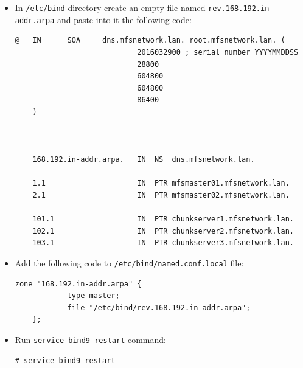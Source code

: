 \documentclass[a4paper,11pt,english]{report}
\def\code#1{\texttt{#1}}
\begin{document}
			\begin{itemize}
				\item In \code{/etc/bind} directory create an empty file named \code{rev.168.192.in-addr.arpa} and paste into it the following code:
					
					\begin{lstlisting}[caption={Content of \code{rev.168.192.in-addr.arpa} file}]
	@	IN      SOA     dns.mfsnetwork.lan. root.mfsnetwork.lan. (
							2016032900 ; serial number YYYYMMDDSS
							28800
							604800
							604800
							86400
	)
	
	
	
	168.192.in-addr.arpa.	IN	NS	dns.mfsnetwork.lan.
	
	1.1						IN	PTR	mfsmaster01.mfsnetwork.lan.
	2.1						IN	PTR	mfsmaster02.mfsnetwork.lan.
	
	101.1					IN	PTR	chunkserver1.mfsnetwork.lan.
	102.1					IN	PTR	chunkserver2.mfsnetwork.lan.
	103.1					IN	PTR	chunkserver3.mfsnetwork.lan.
					\end{lstlisting}
					
				\item Add the following code to \code{/etc/bind/named.conf.local} file:
					
					\begin{lstlisting}[caption={Extra code to add to \code{/etc/bind/named.conf.local} file}]
	zone "168.192.in-addr.arpa" {
	        type master;
	        file "/etc/bind/rev.168.192.in-addr.arpa";
	};
					\end{lstlisting}
					
				\item Run \code{service bind9 restart} command:
					
					\begin{lstlisting}[caption={Running \code{service bind9 restart} command}]
	# service bind9 restart
					\end{lstlisting}
			\end{itemize}
\end{document}
